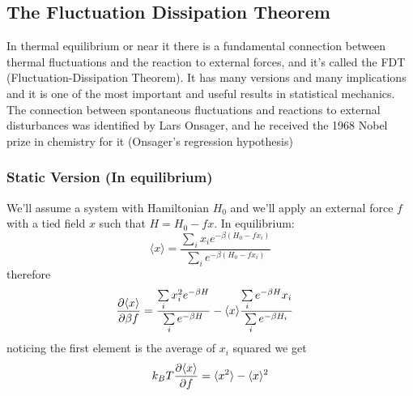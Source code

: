 \subsection{The Fluctuation Dissipation Theorem}
In thermal equilibrium or near it there is a fundamental connection between thermal fluctuations and the reaction to external forces, and it's called the FDT (Fluctuation-Dissipation Theorem). It has many versions and many implications and it is one of the most important and useful results in statistical mechanics. The connection between spontaneous fluctuations and reactions to external disturbances was identified by Lars Onsager, and he received the 1968 Nobel prize in chemistry for it (Onsager's regression hypothesis)
\subsubsection{Static Version (In equilibrium)}
We'll assume a system with Hamiltonian \(H_0\) and we'll apply an external force \(f\) with a tied field \(x\) such that \(H=H_0-fx\). In equilibrium:
\begin{equation}
	\langle x \rangle = \frac{\sum\limits_i x_i e^{-\beta(H_0-fx_i)}}{\sum\limits_i e^{-\beta (H_0-fx_i)}}
\end{equation}
therefore
\begin{align}
	\diffp{\langle x \rangle}{\beta f} &= \frac{\sum\limits_i x_i^2 e^{-\beta H}}{\sum\limits_i e^{-\beta H}} - \langle x \rangle \frac{\sum\limits_i e^{-\beta H} x_i}{\sum\limits_i e^{-\beta H_i}}
\end{align}
noticing the first element is the average of \(x_i\) squared we get
\begin{equation}
	k_B T\diffp{\langle x \rangle}{f} = \langle x^2\rangle - \langle x \rangle^2
\end{equation}
